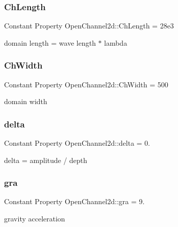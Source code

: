 \subsubsection{\texorpdfstring{Ch\+Length}{ChLength}}
{\footnotesize\ttfamily Constant Property Open\+Channel2d\+::\+Ch\+Length = 28e3}



domain length = wave length $\ast$ lambda 

\mbox{\label{class_open_channel2d_ac64b88f082e0f96c627c3313b05e9fa9}} 
\subsubsection{\texorpdfstring{Ch\+Width}{ChWidth}}
{\footnotesize\ttfamily Constant Property Open\+Channel2d\+::\+Ch\+Width = 500}



domain width 

\mbox{\label{class_open_channel2d_acfffb41190a2dae0106aee6c3d52dee1}} 
\subsubsection{\texorpdfstring{delta}{delta}}
{\footnotesize\ttfamily Constant Property Open\+Channel2d\+::delta = 0.}



delta = amplitude / depth 

\mbox{\label{class_open_channel2d_a700031d06a370545b38c31810c09590c}} 
\subsubsection{\texorpdfstring{gra}{gra}}
{\footnotesize\ttfamily Constant Property Open\+Channel2d\+::gra = 9.}



gravity acceleration 

\mbox{\label{class_open_channel2d_a1c41bef8b83de402f4a8c03504777f73}} 
